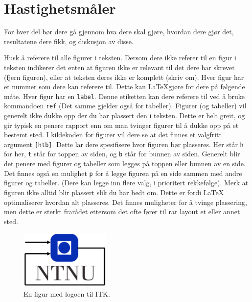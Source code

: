 \section{Hastighetsmåler}
For hver del bør dere gå gjennom hva dere skal gjøre, hvordan dere gjør det, resultatene dere fikk,
og diskusjon av disse. 

Husk å referere til alle figurer i teksten. Dersom dere ikke referer til en 
figur i teksten indikerer det enten at figuren ikke er relevant til det dere
har skrevet (fjern figuren), eller at teksten deres ikke er komplett (skriv om).
Hver figur har et nummer som dere kan referere til. Dette kan \LaTeX gjøre for dere
på følgende måte. Hver figur har en \texttt{label}. Denne etiketten kan dere
referere til ved å bruke kommandoen \texttt{ref} (Det samme gjelder også for tabeller).
Figurer (og tabeller) vil generelt ikke dukke opp der du har plassert den i teksten.
Dette er helt greit, og gir typisk en penere rapport enn om man tvinger figurer til å dukke opp på et bestemt sted. I kildekoden for figurer vil dere se at det finnes et
valgfritt argument \verb+[htb]+. Dette lar dere spesifisere hvor figuren bør plasseres. Her står \verb+h+ for her, \verb+t+ står for toppen av siden, og \verb+b+
står for bunnen av siden. Generelt blir det penere med figurer og tabeller som legges på toppen eller bunnen av en side. Det finnes også en mulighet \verb+p+ for å legge figuren på en side sammen med andre figurer og tabeller. (Dere kan legge inn flere valg, i prioritert rekkefølge). Merk at figuren ikke alltid blir plassert slik du har bedt om. Dette er fordi LaTeX optimaliserer hvordan alt plasseres. Det finnes muligheter for å tvinge plassering, men dette er sterkt frarådet ettersom det ofte fører til rar layout et eller annet sted.

\begin{figure}[b]
	\centering
	\includegraphics[width=0.40\textwidth]{figurer/itk_ntnu.jpg}
	\caption{En figur med logoen til ITK.}
\label{fig:layers_openloop}
\end{figure}
